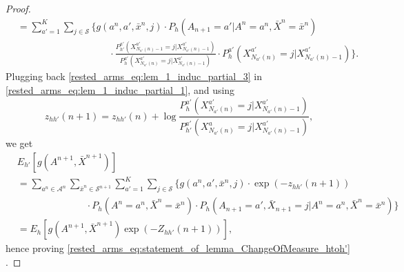 \begin{proof}
\begin{align}
&=\sum\limits_{a'=1}^{K}\sum\limits_{j\in\mathcal{S}}\bigg\lbrace g(a^n,a',\bar{x}^n,j)\cdot P_{h}(A_{n+1}=a'|A^n=a^n,\bar{X}^n=\bar{x}^n)\nonumber\\
&\hspace{4cm}
\cdot\frac{P_{h'}^{a'}(X_{N_{a'}(n)-1}^{a'}=j|X_{N_{a'}(n)-1}^{a'})}{P_{h}^{a'}(X_{N_{a'}(n)}^{a'}=j|X_{N_{a'}(n)-1}^{a'})}\cdot P_{h}^{a'}(X_{N_{a'}(n)}^{a'}=j|X_{N_{a'}(n)-1}^{a'})\bigg\rbrace.\label{rested_arms_eq:lem_1_induc_partial_3}
\end{align}\endgroup
Plugging back \eqref{rested_arms_eq:lem_1_induc_partial_3} in \eqref{rested_arms_eq:lem_1_induc_partial_1}, and using
\begin{equation}
	z_{hh'}(n+1)=z_{hh'}(n)+\log\frac{P_{h}^{a'}(X_{N_{a'}(n)}^{a'}=j|X_{N_{a'}(n)-1}^{a'})}{P_{h'}^{a'}(X_{N_{a'}(n)}^a=j|X_{N_{a'}(n)-1}^{a'})},
\end{equation}
we get
\begingroup\allowdisplaybreaks\begin{align}
&E_{h'}[g(A^{n+1},\bar{X}^{n+1})]\nonumber\\
&=\sum\limits_{a^n\in\mathcal{A}^n}\sum\limits_{\bar{x}^n\in \mathcal{S}^{n+1}}\sum\limits_{a'=1}^{K}\sum\limits_{j\in\mathcal{S}}\bigg\lbrace g(a^n,a',\bar{x}^n,j)\cdot \exp(-z_{hh'}(n+1))\nonumber\\
&\hspace{3cm}\cdot P_h(A^n=a^n,\bar{X}^n=\bar{x}^n)
\cdot P_{h}(A_{n+1}=a',\bar{X}_{n+1}=j|A^n=a^n,\bar{X}^n=\bar{x}^n)\bigg\rbrace\nonumber\\
&=E_h[g(A^{n+1},\bar{X}^{n+1})\exp(-Z_{hh'}(n+1))],
\end{align}\endgroup
hence proving \eqref{rested_arms_eq:statement_of_lemma_ChangeOfMeasure_htoh'} .

\end{proof}
